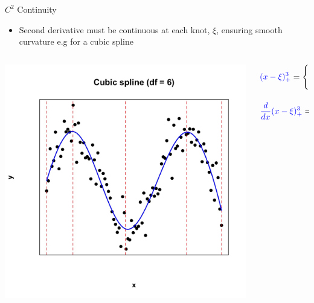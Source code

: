 \documentclass[english]{beamer}
\newcommand{\alertblue}[1]{{\color{blue}#1}}
\begin{document}
\begin{frame}{$C^2$ Continuity}
    \begin{itemize}
        \item \alertblue{Second derivative} must be continuous at each knot, $\xi$, ensuring \alertblue{ smooth curvature} e.g for a \alertblue{cubic spline}
    \end{itemize}        
    \begin{columns}
    \begin{column}{0.5\textwidth}
            \centering
            \includegraphics[width=\linewidth]{images/cubic_spline.jpeg} 
        \end{column}
        \begin{column}{0.7\textwidth}
        \begin{equation*}
           \alertblue{(x - \xi)^3_+} = 
           \begin{cases} 
           \alertblue{(x - \xi)^3}, & x > \xi \\ 
           0, & x \leq \xi 
           \end{cases}
        \end{equation*}
        
        \begin{equation*}
         \alertblue{\frac{d}{dx}(x - \xi)^3_+} = 
         \begin{cases} 
         \alertblue{3(x - \xi)^2}, & x > \xi \\ 
         0, & x \leq \xi 
         \end{cases}
       \end{equation*}


\end{column}
\end{columns}
\end{frame}
\end{document}
